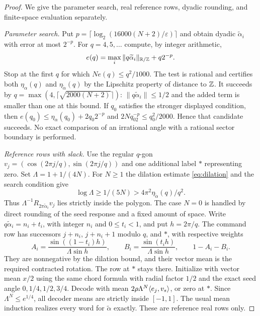 \begin{proof}
We give the parameter search, real reference rows, dyadic rounding,
and finite-space evaluation separately.

\emph{Parameter search.}
Put $p=\lceil\log_2(16000(N+2)/\varepsilon)\rceil$ and obtain dyadic
$\widetilde\alpha_i$ with error at most $2^{-p}$. For $q=4,5,\ldots$
compute, by integer arithmetic,
\[
 e(q)=\max_i\|q\widetilde\alpha_i\|_{\mathbb R/\mathbb Z}+q2^{-p}.
\]
Stop at the first $q$ for which $Ne(q)\le q^2/1000$. The test is
rational and certifies both $\eta_\alpha(q)$ and
$\eta_{\widetilde\alpha}(q)$ by the Lipschitz property of distance to
$\mathbb Z$. It succeeds by $q=\max(4,\lceil\sqrt{2000(N+2)}\rceil)$:
$\|q\widetilde\alpha_i\|\le1/2$ and the added term is smaller than
one at this bound. If $q_0$ satisfies the stronger displayed condition,
then $e(q_0)\le\eta_\alpha(q_0)+2q_0 2^{-p}$ and
$2Nq_02^{-p}\le q_0^2/2000$. Hence that candidate succeeds.
No exact comparison of an irrational angle with a rational sector
boundary is performed.

\emph{Reference rows with slack.}
Use the regular $q$-gon $v_j=(\cos(2\pi j/q),\sin(2\pi j/q))$ and
one additional label $*$ representing zero. Set
$\Lambda=1+1/(4N)$. For $N\ge1$ the dilation estimate
\eqref{eq:dilation} and the search condition give
\[
 \log\Lambda\ge1/(5N)>4\pi^2\eta_{\widetilde\alpha}(q)/q^2.
\]
Thus $\Lambda^{-1}R_{2\pi\widetilde\alpha_i}v_j$ lies strictly inside
the polygon. The case $N=0$ is handled by direct rounding of the seed
response and a fixed amount of space.
Write $q\widetilde\alpha_i=n_i+t_i$, with integer $n_i$ and
$0\le t_i<1$, and put $h=2\pi/q$. The command row has successors
$j+n_i$, $j+n_i+1$ modulo $q$, and $*$, with respective weights
\begin{equation}\label{eq:three-row44}
 A_i=\frac{\sin((1-t_i)h)}{\Lambda\sin h},\qquad
 B_i=\frac{\sin(t_i h)}{\Lambda\sin h},\qquad 1-A_i-B_i.
\end{equation}
They are nonnegative by the dilation bound, and their vector mean is
the required contracted rotation. The row at $*$ stays there. Initialize
with vector mean $x/2$ using the same chord formula with radial factor
$1/2$ and the exact seed angle $0,1/4,1/2,3/4$. Decode with mean
$2\rho\Lambda^N\langle e_j,v_s\rangle$, or zero at $*$. Since
$\Lambda^N\le e^{1/4}$, all decoder means are strictly inside $[-1,1]$.
The usual mean induction realizes every word for
$\widetilde\alpha$ exactly. These are reference real rows only.


\end{proof}
